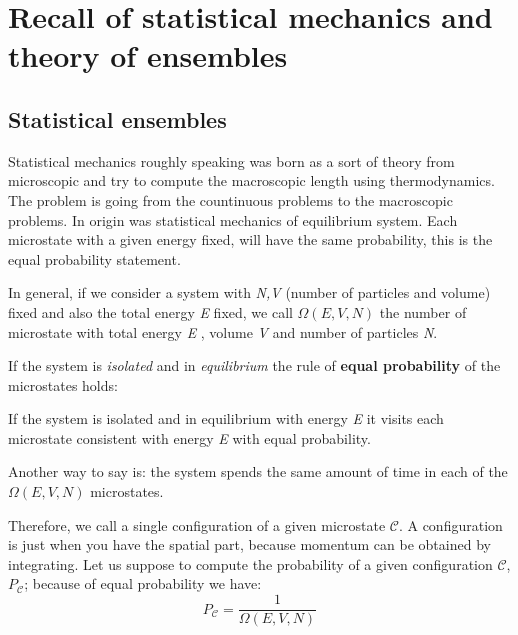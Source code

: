 \documentclass[../main/main.tex]{subfiles}
\begin{document}
\chapter{Recall of statistical mechanics and theory of ensembles}

\section{Statistical ensembles}
Statistical mechanics roughly speaking was born as a sort of theory from microscopic and try to compute the macroscopic length using thermodynamics. The problem is going from the countinuous problems to the macroscopic problems. In origin was statistical mechanics of equilibrium system. Each microstate with a given energy fixed, will have the same probability, this is the equal probability statement.

In general, if we consider a system with \emph{N,V} (number of particles and volume) fixed and also the total energy \emph{E} fixed, we call \( \Omega (E,V,N) \)  the number of microstate with total energy \emph{E} , volume \emph{V} and number of particles \emph{N}.

If the system is \emph{isolated} and in \emph{equilibrium} the rule of \textbf{equal probability} of the microstates holds:
\begin{orangebox}
If the system is isolated and in equilibrium with energy \emph{E} it visits each microstate consistent with energy \emph{E} with equal probability.
\end{orangebox}
Another way to say is: the system spends the same amount of time in each of the \( \Omega (E,V,N) \) microstates.

Therefore, we call  a single configuration of a given microstate \( \mathcal{C}  \). A configuration is just when you have the spatial part, because momentum can be obtained by integrating.
Let us suppose to compute the probability of a given configuration \( \mathcal{C}  \), \( P_{\mathcal{C}} \); because of equal probability we have:
\begin{equation}
  P_{\mathcal{C}} = \frac{1}{\Omega (E,V,N)}
  \label{eq:}
\end{equation}
\end{document}
